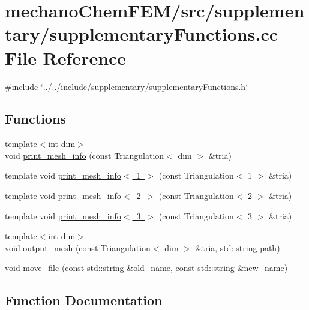 \section{mechano\+Chem\+F\+E\+M/src/supplementary/supplementary\+Functions.cc File Reference}
\label{supplementary_functions_8cc}
{\ttfamily \#include \char`\"{}../../include/supplementary/supplementary\+Functions.\+h\char`\"{}}\newline
\subsection*{Functions}
\begin{DoxyCompactItemize}
\item 
{\footnotesize template$<$int dim$>$ }\\void \mbox{\hyperlink{group___supplementary_ga2971a293263dddc17f3df81add2ffbbe}{print\+\_\+mesh\+\_\+info}} (const Triangulation$<$ dim $>$ \&tria)
\item 
template void \mbox{\hyperlink{supplementary_functions_8cc_a27ee4a9830113522595a507a921b56e5}{print\+\_\+mesh\+\_\+info$<$ 1 $>$}} (const Triangulation$<$ 1 $>$ \&tria)
\item 
template void \mbox{\hyperlink{supplementary_functions_8cc_a26717733da51a761f009de3a1e57cf15}{print\+\_\+mesh\+\_\+info$<$ 2 $>$}} (const Triangulation$<$ 2 $>$ \&tria)
\item 
template void \mbox{\hyperlink{supplementary_functions_8cc_a6bd7935769f623c78960b765b08865c2}{print\+\_\+mesh\+\_\+info$<$ 3 $>$}} (const Triangulation$<$ 3 $>$ \&tria)
\item 
{\footnotesize template$<$int dim$>$ }\\void \mbox{\hyperlink{group___supplementary_ga0272b346b175b931e89b017fd93b5b80}{output\+\_\+mesh}} (const Triangulation$<$ dim $>$ \&tria, std\+::string path)
\item 
void \mbox{\hyperlink{group___supplementary_gae0eb2d2afc3e33a9bb3b409b0171c470}{move\+\_\+file}} (const std\+::string \&old\+\_\+name, const std\+::string \&new\+\_\+name)
\end{DoxyCompactItemize}


\subsection{Function Documentation}
\mbox{\label{supplementary_functions_8cc_a27ee4a9830113522595a507a921b56e5}} 
